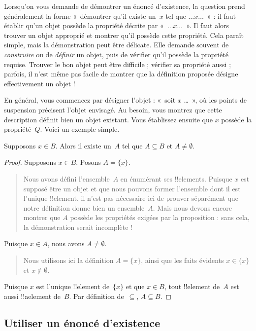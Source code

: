 \documentclass[../../../include/open-logic-section]{subfiles}
\begin{document}
Lorsqu'on vous demande de démontrer un énoncé d'existence,
la question prend généralement la forme «~démontrer qu'il
existe un~$x$ tel que $\dots x \dots$~» : il faut établir
qu'un objet possède la propriété décrite par
«~$\dots x \dots$~». Il faut alors trouver un objet
approprié et montrer qu'il possède cette propriété.
Cela paraît simple, mais la démonstration peut être
délicate. Elle demande souvent de \emph{construire}
ou de \emph{définir} un objet, puis de vérifier qu'il
possède la propriété requise. Trouver le bon objet
peut être difficile ; vérifier sa propriété aussi ;
parfois, il n'est même pas facile de montrer que la
définition proposée désigne effectivement un objet !{}

En général, vous commencez par désigner l'objet :
«~soit $x$ \dots~», où les points de suspension
précisent l'objet envisagé. Au besoin, vous montrez
que cette description définit bien un objet existant.
Vous établissez ensuite que $x$ possède la
propriété~$Q$. Voici un exemple simple.

\begin{prop}
  Supposons $x \in B$. Alors il existe un~$A$
  tel que $A \subseteq B$ et $A \neq \emptyset$.
\end{prop}

\begin{proof}
  Supposons $x \in B$. Posons $A = \{x\}$.
  \begin{quote}
    Nous avons défini l'ensemble~$A$ en énumérant
    ses !!{element}s. Puisque $x$ est supposé être
    un objet et que nous pouvons former l'ensemble
    dont il est l'unique !!{element}, il n'est pas
    nécessaire ici de prouver séparément que notre
    définition donne bien un ensemble~$A$. Mais
    nous devons encore montrer que $A$ possède les
    propriétés exigées par la proposition : sans
    cela, la démonstration serait incomplète !{}
  \end{quote}
  Puisque $x \in A$, nous avons $A \neq \emptyset$.
  \begin{quote}
    Nous utilisons ici la définition $A = \{x\}$,
    ainsi que les faits évidents $x \in \{x\}$ et
    $x \notin \emptyset$.
  \end{quote}
  Puisque $x$ est l'unique !!{element} de~$\{x\}$
  et que $x \in B$, tout !!{element} de~$A$
  est aussi !!a{element} de~$B$. Par définition
  de~$\subseteq$, $A \subseteq B$.
\end{proof}

\subsection{Utiliser un énoncé d'existence}
\end{document}
